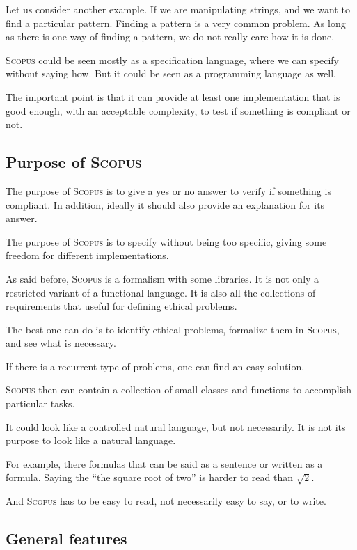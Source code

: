 \documentclass[12pt,a4paper]{article}
\newcommand{\Scopus}{\textsc{Scopus}\xspace}
\begin{document}
    Let us consider another example.
    If we are manipulating strings, and we want to find a particular pattern.
    Finding a pattern is a very common problem.
    As long as there is one way of finding a pattern, we do not really care how it is done.

    \Scopus could be seen mostly as a specification language, where we can specify without saying how.
    But it could be seen as a programming language as well.

    The important point is that it can provide at least one implementation that is good enough, with an acceptable complexity, to test if something is compliant or not.

    \subsection{Purpose of \Scopus}

    The purpose of \Scopus is to give a yes or no answer to verify if something is compliant.
    In addition, ideally it should also provide an explanation for its answer.

    The purpose of \Scopus is to specify without being too specific, giving some freedom for different implementations.

    As said before, \Scopus is a formalism with some libraries.
    It is not only a restricted variant of a functional language.
    It is also all the collections of requirements that useful for defining ethical problems.

    The best one can do is to identify ethical problems, formalize them in \Scopus, and see what is necessary.

    If there is a recurrent type of problems, one can find an easy solution.

    \Scopus then can contain a collection of small classes and functions to accomplish particular tasks.

    It could look like a controlled natural language, but not necessarily.
    It is not its purpose to look like a natural language.

    For example, there formulas that can be said as a sentence or written as a formula.
    Saying the ``the square root of two'' is harder to read than $\sqrt{2}$.

    And \Scopus has to be easy to read, not necessarily easy to say, or to write.

    \subsection{General features}
\end{document}
